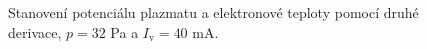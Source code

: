 \documentclass[a4paper,12pt]{article}
\begin{document}
\begin{figure}[h]
	\centering
	\begin{subfigure}[b]{.49\textwidth}
		\centering
	\end{subfigure}
	\begin{subfigure}[b]{.49\textwidth}
		\centering
	\end{subfigure}
	\caption{Stanovení potenciálu plazmatu a elektronové teploty pomocí druhé 
	derivace, $p = 32$ 
	\si{\pascal} a $I_\text{v} = 40$ \si{\milli\ampere}.}
	\label{data5sec}
\end{figure}
\end{document}
